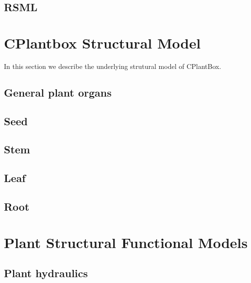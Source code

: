 \documentclass[a4paper]{article}
\begin{document}
\subsection{RSML} \label{ssec:rsml}
%




\newpage
\section{CPlantbox Structural Model} \label{sec:cplantobx}

In this section we describe the underlying strutural model of CPlantBox. 

\subsection{General plant organs} \label{ssec:organs}


\subsection{Seed} \label{ssec:seed}


\subsection{Stem} \label{ssec:stem}


\subsection{Leaf} \label{ssec:leaf}


\subsection{Root} \label{ssec:root}





\newpage
\section{Plant Structural Functional Models} \label{sec:fspm}

\subsection{Plant hydraulics} \label{ssec:hydraulics}
% 
\end{document}
